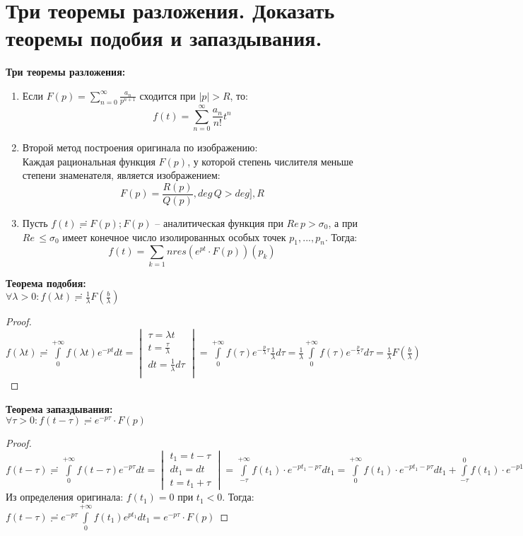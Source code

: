\newpage
\section{Три теоремы разложения. Доказать теоремы подобия и запаздывания.}

\textbf{Три теоремы разложения:}
\begin{enumerate}
    \item Если $F(p) = \sum_{n=0}^\infty\frac{a_n}{p^{n+1}}$ сходится при $|p|>R$, то:
    $$f(t)=\sum_{n=0}^\infty\frac{a_n}{n!}t^n$$
    \item Второй метод построения оригинала по изображению:\\
    Каждая рациональная функция $F(p)$, у которой степень числителя меньше степени знаменателя, является изображением:
    $$F(p)=\frac{R(p)}{Q(p)}, deg\,Q>deg],R$$
    \item Пусть $f(t)\risingdotseq F(p); F(p)$ -- аналитическая функция при $Re\,p>\sigma_0$, а при $Re\,\leq \sigma_0$ имеет конечное число изолированных особых точек $p_1, ..., p_n$. Тогда:
    $$f(t)=\sum_{k=1}{n}res(e^{pt}\cdot F(p))(p_k)$$
\end{enumerate}

\textbf{Теорема подобия:}\\
$\forall \lambda > 0: f(\lambda t) \risingdotseq \frac{1}{\lambda} F\left(\frac{b}{\lambda}\right)$

\begin{proof}
    \ \\
    $f(\lambda t)\risingdotseq \int\limits_{0}^{+\infty}f(\lambda t)e^{-pt}dt =
    \begin{vmatrix}
        \tau=\lambda t\\
        t=\frac{\tau}{\lambda}\\
        dt=\frac{1}{\lambda}d\tau\\
    \end{vmatrix}
    = \int\limits_0^{+\infty} f(\tau)e^{-\frac{p}{\lambda}\tau}\frac{1}{\lambda}d\tau = \frac{1}{\lambda}\int\limits_0^{+\infty}f(\tau)e^{-\frac{p}{\lambda}\tau}d\tau=\frac{1}{\lambda} F\left(\frac{b}{\lambda}\right)$
\end{proof}

\textbf{Теорема запаздывания:}\\
$\forall \tau > 0: f(t-\tau) \risingdotseq e^{-p\tau}\cdot F(p)$
    
\begin{proof}
    \ \\
    $f(t-\tau)\risingdotseq \int\limits_0^{+\infty} f(t-\tau)e^{-p\tau}dt = 
    \begin{vmatrix}
        t_1=t-\tau\\
        dt_1=dt\\
        t=t_1+\tau
    \end{vmatrix}
    = \int\limits_{-\tau}^{+\infty}f(t_1)\cdot e^{-pt_1-p\tau}dt_1=\int\limits_0^{+\infty}f(t_1)\cdot e^{-pt_1-p\tau}dt_1+\int\limits_{-\tau}^0 f(t_1)\cdot e^{-p1_1-p\tau}dt_1$\\
    Из определения оригинала: $f(t_1)=0$ при $t_1<0$. Тогда:\\
    $f(t-\tau)\risingdotseq e^{-p\tau}\int\limits_0^{+\infty} f(t_1)e^{pt_1}dt_1 = e^{-p\tau}\cdot F(p)$
\end{proof}
    